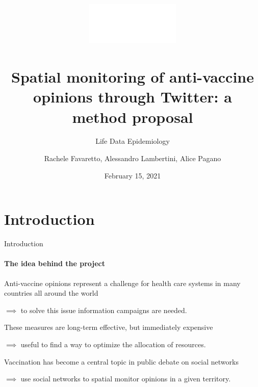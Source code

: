 \documentclass[9pt]{beamer}
\title[\fontfamily{\sfdefault}\selectfont Spatial monitoring of anti-vaccine opinions]{
	\includegraphics[height=2cm]{images/logo/unipd_logo_white.png}\\
	~\\
	\textbf{
		Spatial monitoring of anti-vaccine opinions through Twitter: a method proposal
	}
}
\subtitle{\fontfamily{\sfdefault}\selectfont Life Data Epidemiology}
\author[\fontfamily{\sfdefault}\selectfont Favaretto, Lambertini, Pagano]{Rachele Favaretto, Alessandro Lambertini, Alice Pagano}
\date{\fontfamily{\sfdefault}\selectfont February 15, 2021}
\begin{document}
	\maketitle

%
%		



	\section{Introduction}
	
	\begin{frame}[c]{Introduction}
	\framesubtitle{The idea behind the project}

	\medskip
	
    \alert{Anti-vaccine opinions} represent a \alert{challenge} for \alert{health care systems} in many countries all around the world
    
    \medskip
    
    $\implies$ to solve this issue \alert{information campaigns} are needed. 
    
    \medskip 
    
    These measures are long-term effective, but immediately \alert{expensive}
    
    \medskip
    
    $\implies$ useful to find a way to \alert{optimize} the \alert{allocation of resources}.
	
	\medskip
	\medskip
	\medskip
	
	\pause
	
	\medskip
	
	\alert{Vaccination} has become a \alert{central topic} in public debate on \alert{social networks} 
	
	\medskip
	
	$\implies$ use social networks to \alert{spatial monitor opinions} in a given territory.
	
	\end{frame}
	
% 
	
\end{document}
